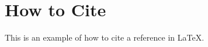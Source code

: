 \label{chapter:tokenization}

\Blindtext [1]

\section{How to Cite}
This is an example of how to cite a reference in \LaTeX \cite{evans2011write, kopka1995guide}.  
